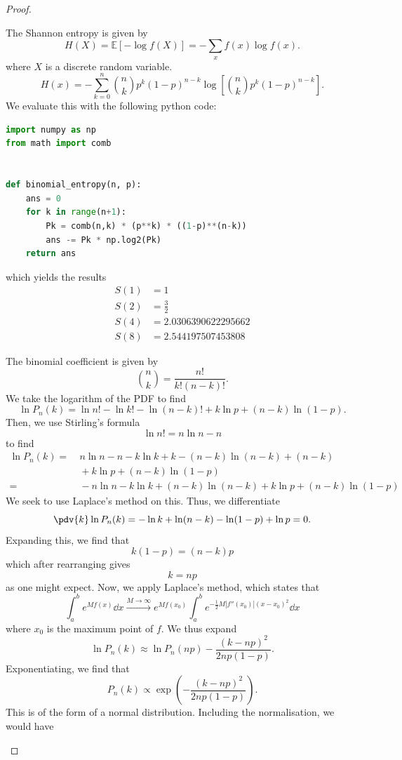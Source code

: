 \begin{proof}
\begin{parts}
\item The Shannon entropy is given by
	\[
		H(X) = \mathbb{E}[-\log f(X)]=-\sum_x f(x)\log f(x)
	.\] 
where $X$ is a discrete random variable.
	\[
		H(x) = -\sum_{k=0}^{n} \binom{n}{k}p^k(1-p)^{n-k}\log\left[ \binom{n}{k}p^k(1-p)^{n-k} \right] 
	.\] 
We evaluate this with the following python code:
\begin{lstlisting}[language=Python]
import numpy as np
from math import comb


def binomial_entropy(n, p):
    ans = 0
    for k in range(n+1):
        Pk = comb(n,k) * (p**k) * ((1-p)**(n-k))
        ans -= Pk * np.log2(Pk)
    return ans
\end{lstlisting}
which yields the results
\begin{align*}
	S(1) &= 1 \\
	S(2) &= \frac{3}{2}\\
	S(4) &=2.0306390622295662  \\
	S(8) &=2.544197507453808  
\end{align*}
\item The binomial coefficient is given by
	\[
		\binom{n}{k} = \frac{n!}{k!(n-k)!}
	.\] 
	We take the logarithm of the PDF to find
	\[
	\ln P_n(k) = \ln n! - \ln k! - \ln (n-k)! + k \ln p + (n-k)\ln (1-p)
	.\] 
	Then, we use Stirling's formula
	\[
	\ln n! = n \ln n - n
	\] 
	to find
	\begin{align*}
		\ln P_n(k) =&~ n\ln n - n -k \ln k + k - (n-k)\ln (n-k) + (n-k)\\
		&~+k\ln p + (n-k)\ln (1-p)\\
		=&~-n\ln n - k\ln k + (n-k)\ln (n-k) + k \ln p + (n-k)\ln (1-p)
	\end{align*}
	We seek to use Laplace's method on this. Thus, we differentiate
	\[
		\pdv{k} \ln P_n(k) = -\ln k + \ln (n-k) - \ln (1-p)+\ln p = 0
	.\] 
	Expanding this, we find that
	\[
	k(1-p) = (n-k)p
	\] 
	which after rearranging gives
	\[
	k = np
	\] 
	as one might expect. Now, we apply Laplace's method, which states that
	\[
		\int_a^b e^{Mf(x)}\dd{x} \xrightarrow{M\to\infty}e^{Mf(x_0)}\int_a^b e^{-\frac{1}{2}M|f''(x_0)|(x-x_0)^2}\dd{x} 
	\] 
	where $x_0$ is the maximum point of $f$. We thus expand
	\[
	\ln P_n(k) \approx \ln P_n(np) - \frac{(k-np)^2}{2np(1-p)}
	.\] 
	Exponentiating, we find that
	\[
	P_n(k) \propto \exp\left( -\frac{(k-np)^2}{2np(1-p)} \right) 
	.\] 
	This is of the form of a normal distribution. Including the normalisation, we would have

\end{parts}
\end{proof}
